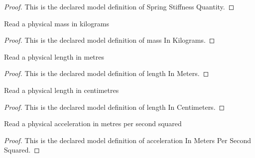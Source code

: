 \begin{proof}
  This is the declared model definition of Spring Stiffness Quantity.
\end{proof}
\begin{definition}
  \label{def:physics:phyx-mini-0258:phyxminiproblems-problemphyxmini0258-massinkilograms}
  Read a physical mass in kilograms
\end{definition}
\begin{proof}
  This is the declared model definition of mass In Kilograms.
\end{proof}
\begin{definition}
  \label{def:physics:phyx-mini-0258:phyxminiproblems-problemphyxmini0258-lengthinmeters}
  Read a physical length in metres
\end{definition}
\begin{proof}
  This is the declared model definition of length In Meters.
\end{proof}
\begin{definition}
  \label{def:physics:phyx-mini-0258:phyxminiproblems-problemphyxmini0258-lengthincentimeters}
  Read a physical length in centimetres
\end{definition}
\begin{proof}
  This is the declared model definition of length In Centimeters.
\end{proof}
\begin{definition}
  \label{def:physics:phyx-mini-0258:phyxminiproblems-problemphyxmini0258-accelerationinmeterspersecondsquared}
  Read a physical acceleration in metres per second squared
\end{definition}
\begin{proof}
  This is the declared model definition of acceleration In Meters Per Second Squared.
\end{proof}
